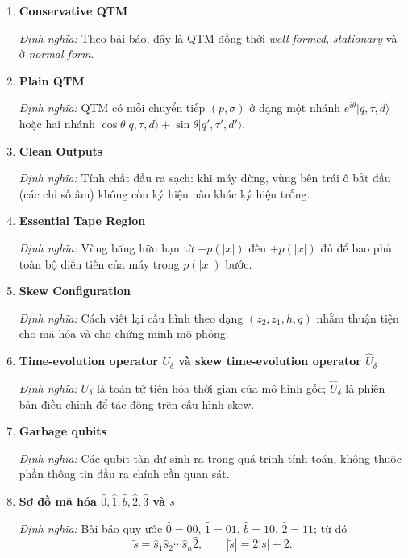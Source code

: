 \documentclass[12pt,a4paper]{article}
\begin{document}
\begin{enumerate}[leftmargin=*,itemsep=0.8em]
\textit{Định nghĩa:} Dạng chuẩn của QTM thỏa $\delta(q_f,\sigma)=|q_0\rangle|\sigma\rangle|R\rangle$ với mọi $\sigma\in\Gamma$.

\item \textbf{Conservative QTM}

\textit{Định nghĩa:} Theo bài báo, đây là QTM đồng thời \textit{well-formed}, \textit{stationary} và ở \textit{normal form}.

\item \textbf{Plain QTM}

\textit{Định nghĩa:} QTM có mỗi chuyển tiếp $(p,\sigma)$ ở dạng một nhánh $e^{i\theta}|q,\tau,d\rangle$ hoặc hai nhánh $\cos\theta|q,\tau,d\rangle+\sin\theta|q',\tau',d'\rangle$.

\item \textbf{Clean Outputs}

\textit{Định nghĩa:} Tính chất đầu ra sạch: khi máy dừng, vùng bên trái ô bắt đầu (các chỉ số âm) không còn ký hiệu nào khác ký hiệu trống.

\item \textbf{Essential Tape Region}

\textit{Định nghĩa:} Vùng băng hữu hạn từ $-p(|x|)$ đến $+p(|x|)$ đủ để bao phủ toàn bộ diễn tiến của máy trong $p(|x|)$ bước.

\item \textbf{Skew Configuration}

\textit{Định nghĩa:} Cách viết lại cấu hình theo dạng $(z_2,z_1,h,q)$ nhằm thuận tiện cho mã hóa và cho chứng minh mô phỏng.

\item \textbf{Time-evolution operator $U_\delta$ và skew time-evolution operator $\widehat{U}_{\delta}$}

\textit{Định nghĩa:} $U_\delta$ là toán tử tiến hóa thời gian của mô hình gốc; $\widehat{U}_{\delta}$ là phiên bản điều chỉnh để tác động trên cấu hình skew.

\item \textbf{Garbage qubits}

\textit{Định nghĩa:} Các qubit tàn dư sinh ra trong quá trình tính toán, không thuộc phần thông tin đầu ra chính cần quan sát.

\item \textbf{Sơ đồ mã hóa $\hat{0},\hat{1},\hat{b},\hat{2},\hat{3}$ và $\widetilde{s}$}

\textit{Định nghĩa:} Bài báo quy ước $\hat{0}=00$, $\hat{1}=01$, $\hat{b}=10$, $\hat{2}=11$; từ đó
\[
\widetilde{s}=\hat{s}_1\hat{s}_2\cdots\hat{s}_n\hat{2},\qquad |\widetilde{s}|=2|s|+2.
\]


\end{enumerate}
\end{document}
